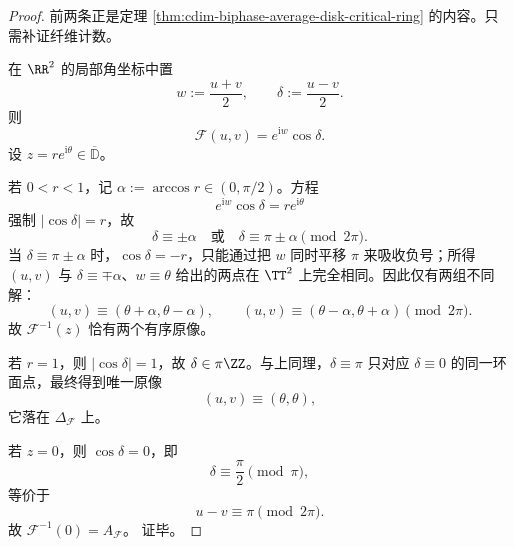 \begin{proof}
前两条正是定理 \ref{thm:cdim-biphase-average-disk-critical-ring} 的内容。只需补证纤维计数。

在 \(\RR^2\) 的局部角坐标中置
\[
w:=\frac{u+v}{2},
\qquad
\delta:=\frac{u-v}{2}.
\]
则
\[
\mathcal F(u,v)=e^{\mathrm{i}w}\cos\delta.
\]
设 \(z=re^{\mathrm{i}\theta}\in\overline{\mathbb D}\)。

若 \(0<r<1\)，记 \(\alpha:=\arccos r\in(0,\pi/2)\)。方程
\[
e^{\mathrm{i}w}\cos\delta=re^{\mathrm{i}\theta}
\]
强制 \(|\cos\delta|=r\)，故
\[
\delta\equiv \pm \alpha
\quad\text{或}\quad
\delta\equiv \pi\pm\alpha
\pmod{2\pi}.
\]
当 \(\delta\equiv \pi\pm\alpha\) 时，\(\cos\delta=-r\)，只能通过把 \(w\) 同时平移 \(\pi\) 来吸收负号；所得 \((u,v)\) 与 \(\delta\equiv\mp\alpha\)、\(w\equiv\theta\) 给出的两点在 \(\TT^2\) 上完全相同。因此仅有两组不同解：
\[
(u,v)\equiv (\theta+\alpha,\theta-\alpha),
\qquad
(u,v)\equiv (\theta-\alpha,\theta+\alpha)
\pmod{2\pi}.
\]
故 \(\mathcal F^{-1}(z)\) 恰有两个有序原像。

若 \(r=1\)，则 \(|\cos\delta|=1\)，故 \(\delta\in\pi\ZZ\)。与上同理，\(\delta\equiv \pi\) 只对应 \(\delta\equiv 0\) 的同一环面点，最终得到唯一原像
\[
(u,v)\equiv (\theta,\theta),
\]
它落在 \(\Delta_{\mathcal F}\) 上。

若 \(z=0\)，则 \(\cos\delta=0\)，即
\[
\delta\equiv \frac{\pi}{2}\pmod{\pi},
\]
等价于
\[
u-v\equiv \pi\pmod{2\pi}.
\]
故 \(\mathcal F^{-1}(0)=A_{\mathcal F}\)。
证毕。
\end{proof}

